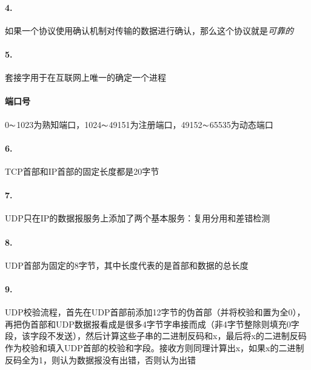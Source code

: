 \documentclass[UTF8]{ctexart} %
\begin{document}
\paragraph{4.} 如果一个协议使用确认机制对传输的数据进行确认，那么这个协议就是\emph{可靠的}

\paragraph{5.} 套接字用于在互联网上唯一的确定一个进程

\paragraph{端口号} 0$\thicksim$1023为熟知端口，1024$\thicksim$49151为注册端口，49152$\thicksim$65535为动态端口

\begin{table}[H]
    \caption{常用熟知端口}
\end{table}

\paragraph{6.} TCP首部和IP首部的固定长度都是20字节

\paragraph{7.} UDP只在IP的数据报服务上添加了两个基本服务：复用分用和差错检测

\paragraph{8.} UDP首部为固定的8字节，其中长度代表的是首部和数据的总长度

\paragraph{9.} UDP校验流程，首先在UDP首部前添加12字节的伪首部（并将校验和置为全0），再把伪首部和UDP数据报看成是很多4字节字串接而成（非4字节整除则填充0字段，该字段不发送），然后计算这些子串的二进制反码和x，最后将x的二进制反码作为校验和填入UDP首部的校验和字段。接收方则同理计算出x，如果x的二进制反码全为1，则认为数据报没有出错，否则认为出错
\end{document}
